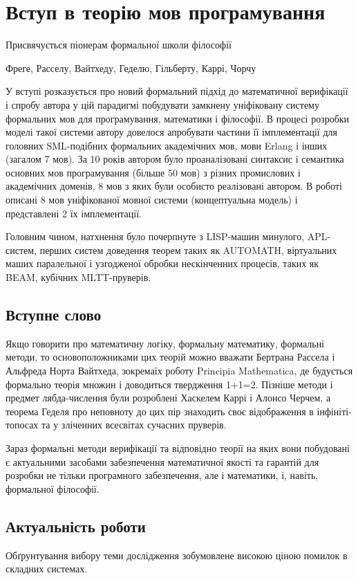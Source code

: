 \chapter{Вступ в теорію мов програмування}
\epigraph{Присвячується піонерам формальної школи філософії}
         {Фреге, Расселу, Вайтхеду, Геделю, Гільберту, Каррі, Чорчу}

У вступі розказується про новий формальний підхід до математичної верифікації і спробу автора
у цій парадигмі побудувати замкнену уніфіковану систему формальних мов для
програмування, математики і філософії. В процесі розробки моделі такої системи автору
довелося апробувати частини її імплементації для головних SML-подібних формальних академічних мов,
мови Erlang і інших (загалом 7 мов). За 10 років автором було проаналізовані
синтаксис і семантика основних мов програмування (більше 50 мов) з різних промислових
і академічних доменів, 8 мов з яких були особисто реалізовані автором. В роботі
описані 8 мов уніфікованої мовної системи (концептуальна модель) і представлені 2 їх імплементації.

Головним чином, натхнення було почерпнуте з LISP-машин минулого, APL-систем,
перших систем доведення теорем таких як AUTOMATH, віртуальних маших паралельної
і узгодженої обробки нескінченних процесів, таких як BEAM, кубічних MLTT-пруверів.

\section*{Вступне слово}
Якщо говорити про математичну логіку, формальну математику, формальні методи,
то основоположниками цих теорій можно вважати Бертрана Рассела і Альфреда Норта Вайтхеда, зокремаїх роботу
Principia Mathematica, де будується формально теорія множин і доводиться твердження 1+1=2. Пізніше методи і предмет
лябда-числення були розроблені Хаскелем Каррі і Алонсо Черчем, а теорема Геделя про неповноту до цих пір
знаходить своє відображення в інфініті-топосах та у зліченних всесвітах сучасних пруверів.

Зараз формальні методи верифікації та відповідно теорії на яких вони побудовані
є актуальними засобами забезпечення математичної якості та гарантій для розробки не тільки
програмного забезпечення, але і математики, і, навіть, формальної філософії.

\section{Актуальність роботи}
Обґрунтування вибору теми дослідження зобумовлене високою ціною помилок в складних системах.

